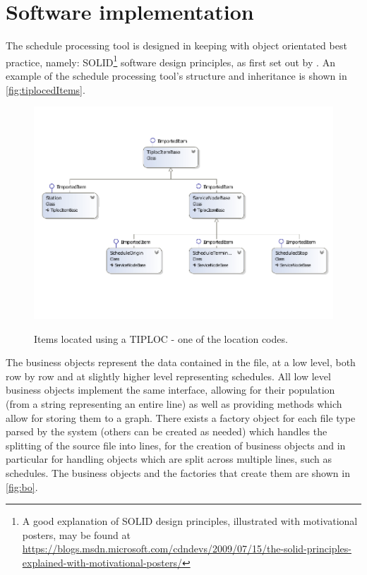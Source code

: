 \section{Software implementation} 
The schedule processing tool is designed in keeping with object orientated best practice, namely: SOLID\footnote{A good explanation of SOLID design principles, illustrated with motivational posters, may be found at \url{https://blogs.msdn.microsoft.com/cdndevs/2009/07/15/the-solid-principles-explained-with-motivational-posters/}} software design principles, as first set out by \citet{Martin2003}. An example of the schedule processing tool's structure and inheritance is shown in \autoref{fig:tiplocedItems}.  

 \begin{figure}[!h]
\myfloatalign
{\includegraphics[width=\linewidth]{gfx/ItemsWithTIPLOCsResized}} 
\caption{Items located using a TIPLOC - one of the location codes.}
\label{fig:tiplocedItems}
\end{figure}

The business objects represent the data contained in the file, at a low level, both row by row and at slightly higher level representing schedules. All low level business objects implement the same interface, allowing for their population (from a string representing an entire line) as well as providing methods which allow for storing them to a graph. There exists a factory object for each file type parsed by the system (others can be created as needed) which handles the splitting of the source file into lines, for the creation of business objects and in particular for handling objects which are split across multiple lines, such as schedules. The business objects and the factories that create them are shown in \autoref{fig:bo}.

